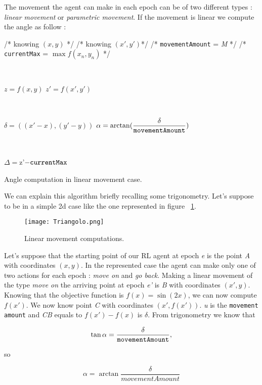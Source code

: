 The movement the agent can make in each epoch can be of two different types : \textit{linear movement} or \textit{parametric movement}. If the movement is linear we compute the angle as follow :

\begin{algorithm}
	/* knowing $(x, y)$ */ \;
	/* knowing $(x', y')$*/ \;
	/* {\tt movementAmount} = \textit{M} */ \;
	/* {\tt currentMax} = $\max f(x_n, y_n)$ */ \;
	
	
	\
	
	$z = f(x, y)$ \;
	$z' = f(x', y')$\;
	
	\
	
	$\delta = ((x'-x),  (y'-y))$ \;
	$\alpha = \arctan(\dfrac{\delta}{\tt movementAmount})$
	 
	 \
	 
	 $\Delta = $z'$ - {\tt currentMax} $
	 
	 \caption{Angle computation in linear movement case.} 
	
\end{algorithm}

We can explain this algorithm briefly recalling some trigonometry. Let's suppose to be in a simple 2d case like the one represented in figure ~\ref{fig:LMComputations}.

\begin{figure} [h!]
	\centering
	\texttt{[image: Triangolo.png]}
	\caption{Linear movement computations.}
	\label{fig:LMComputations}
\end{figure}

Let's suppose that the starting point of our RL agent at epoch \textit{e} is the point \textit{A} with coordinates $(x, y)$. In the represented case the agent can make only one of two actions for each epoch : \textit{move on} and \textit{go back}. Making a linear movement of the type \textit{move on} the arriving point at epoch \textit{e'} is \textit{B} with coordinates $(x', y)$. Knowing that the objective function is $f(x) = \sin(2x)$, we can now compute $f(x')$. We now know point \textit{C} with coordinates $(x', f(x'))$. \textit{u} is the {\tt movement amount} and \textit{CB} equals to $f(x') - f(x)$ is $\delta$. From trigonometry we know that 

\begin{equation}
	\tan \alpha = \dfrac{\delta}{\tt movementAmount},
\end{equation}

so 

\begin{equation}
	\alpha = \arctan \dfrac{\delta}{movementAmount}
\end{equation}

